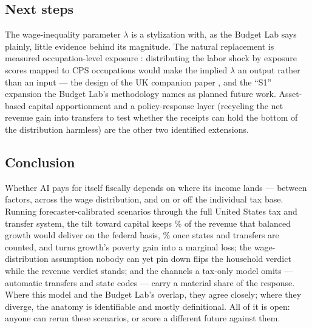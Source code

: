 \subsection{Next steps}

The wage-inequality parameter $\lambda$ is a stylization with, as the Budget
Lab says plainly, little evidence behind its magnitude. The natural
replacement is measured occupation-level exposure
\citep{felten2021, eloundou2024}: distributing the labor shock by exposure
scores mapped to CPS occupations would make the implied $\lambda$ an output
rather than an input --- the design of the UK companion paper
\citep{ahmadi2026}, and the ``S1'' expansion the Budget Lab's methodology
names as planned future work. Asset-based capital apportionment and a
policy-response layer (recycling the net revenue gain into transfers to test
whether the receipts can hold the bottom of the distribution harmless) are
the other two identified extensions.

\subsection{Conclusion}

Whether AI pays for itself fiscally depends on where its income lands ---
between factors, across the wage distribution, and on or off the individual
tax base. Running forecaster-calibrated scenarios through the full United
States tax and transfer system, the tilt toward capital keeps
\genKeptMatchedRapidPct\% of the revenue that balanced growth would deliver
on the federal basis, \genKeptHouseholdRapidPct\% once states and transfers
are counted, and turns growth's poverty gain into a marginal loss; the
wage-distribution assumption nobody can yet pin down flips the household
verdict while the revenue verdict stands; and the channels a tax-only model omits --- automatic transfers and
state codes --- carry a material share of the response. Where this model and
the Budget Lab's overlap, they agree closely; where they diverge, the
anatomy is identifiable and mostly definitional. All of it is open:
anyone can rerun these scenarios, or score a different future against them.
